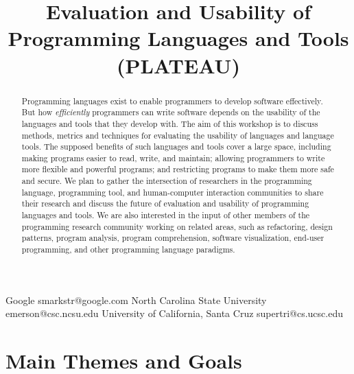 \documentclass{sigplanconf}
\begin{document}
\title{Evaluation and Usability of Programming Languages and Tools (PLATEAU)}

           {Google}
           {smarkstr@google.com}      
           {North Carolina State University}
           {emerson@csc.ncsu.edu}
           {University of California, Santa Cruz}
           {supertri@cs.ucsc.edu}
\date{}

\maketitle
\begin{abstract}

  Programming languages exist to enable programmers to develop
  software effectively.  But how \emph{efficiently} programmers can
  write software depends on the usability of the languages and tools
  that they develop with.  The aim of this workshop is to discuss
  methods, metrics and techniques for evaluating the usability of
  languages and language tools.  The supposed benefits of such
  languages and tools cover a large space, including making programs
  easier to read, write, and maintain; allowing programmers to write
  more flexible and powerful programs; and restricting programs to
  make them more safe and secure. We plan to gather the intersection
  of researchers in the programming language, programming tool, and
  human-computer interaction communities to share their research and
  discuss the future of evaluation and usability of programming
  languages and tools. We are also interested in the input of other
  members of the programming research community working on related
  areas, such as refactoring, design patterns, program analysis,
  program comprehension, software visualization, end-user programming,
  and other programming language paradigms.

\end{abstract}





\section{Main Themes and Goals}
\end{document}
